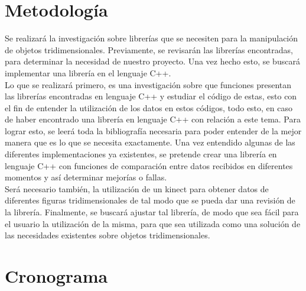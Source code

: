\documentclass[letterpaper]{article}
\begin{document}
\section{Metodología}


Se realizará la investigación sobre librerías que se necesiten para la manipulación de objetos tridimensionales. Previamente, se revisarán las 
librerías encontradas, para determinar la necesidad de nuestro proyecto. 
Una vez hecho esto, se buscará implementar una librería en el lenguaje C++.\\

Lo que se realizará primero, es una investigación sobre que funciones presentan las librerías encontradas en lenguaje C++ y estudiar el código de estas,
esto con el fin de entender la utilización de los datos en estos códigos, todo esto, en caso de haber encontrado una librería en lenguaje C++ con relación a este tema.
Para lograr esto, se leerá toda la bibliografía necesaria para poder entender de la mejor manera que es lo que se necesita exactamente. Una vez
entendido algunas de las diferentes implementaciones ya existentes, se pretende crear una librería en lenguaje C++ con funciones de comparación entre datos
recibidos en diferentes momentos y así determinar mejorías o fallas. \\

Será necesario también, la utilización de un
kinect para obtener datos de diferentes figuras tridimensionales de tal modo que se pueda dar una revisión de la librería. Finalmente, se buscará ajustar tal librería,
de modo que sea fácil para el usuario la utilización de la misma, para que sea utilizada como una solución de las necesidades
existentes sobre objetos tridimensionales.\\



\section{Cronograma}
\end{document}
